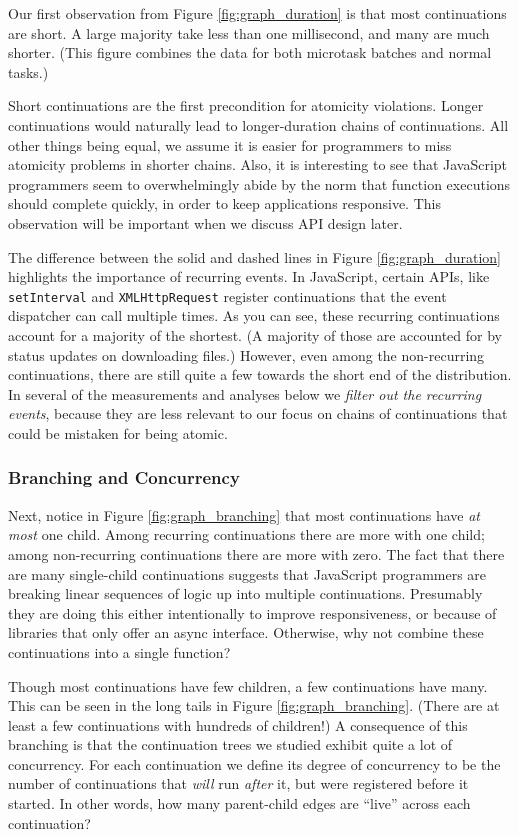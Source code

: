 \documentclass[acmsmall,anonymous,review]{acmart}\settopmatter{printfolios=true,printccs=false,printacmref=false}
\begin{document}
Our first observation from Figure \ref{fig:graph_duration} is that most continuations are short.
A large majority take less than one millisecond, and many are much shorter.
(This figure combines the data for both microtask batches and normal tasks.)

Short continuations are the first precondition for atomicity violations.
Longer continuations would naturally lead to longer-duration chains of continuations.
All other things being equal, we assume it is easier for programmers to miss atomicity problems in shorter chains.
Also, it is interesting to see that JavaScript programmers seem to overwhelmingly abide by the norm that function executions should complete quickly, in order to keep applications responsive.
This observation will be important when we discuss API design later.

The difference between the solid and dashed lines in Figure \ref{fig:graph_duration} highlights the importance of recurring events.
In JavaScript, certain APIs, like \texttt{setInterval} and \texttt{XMLHttpRequest} register continuations that the event dispatcher can call multiple times.
As you can see, these recurring continuations account for a majority of the shortest.
(A majority of those are accounted for by status updates on downloading files.)
However, even among the non-recurring continuations, there are still quite a few towards the short end of the distribution.
In several of the measurements and analyses below we \emph{filter out the recurring events}, because they are less relevant to our focus on chains of continuations that could be mistaken for being atomic.

\subsubsection{Branching and Concurrency}

Next, notice in Figure \ref{fig:graph_branching} that most continuations have \emph{at most} one child.
Among recurring continuations there are more with one child; among non-recurring continuations there are more with zero.
The fact that there are many single-child continuations suggests that JavaScript programmers are breaking linear sequences of logic up into multiple continuations.
Presumably they are doing this either intentionally to improve responsiveness, or because of libraries that only offer an async interface.
Otherwise, why not combine these continuations into a single function?

Though most continuations have few children, a few continuations have many.
This can be seen in the long tails in Figure \ref{fig:graph_branching}.
(There are at least a few continuations with hundreds of children!)
A consequence of this branching is that the continuation trees we studied exhibit quite a lot of concurrency.
For each continuation we define its degree of concurrency to be the number of continuations that \emph{will} run \emph{after} it, but were registered before it started.
In other words, how many parent-child edges are ``live'' across each continuation?
\end{document}
